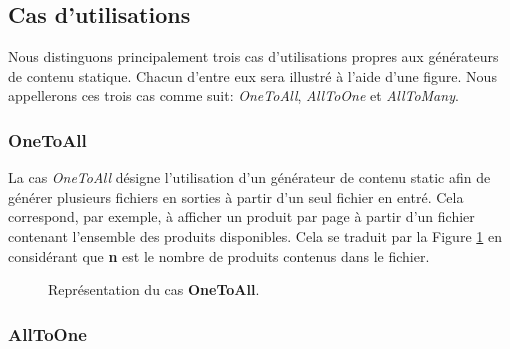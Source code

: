 	\subsection{Cas d'utilisations}
	
		Nous distinguons principalement trois cas d'utilisations propres aux générateurs de contenu statique. Chacun d'entre eux sera illustré à l'aide d'une figure. Nous appellerons ces trois cas comme suit: \textit{OneToAll}, \textit{AllToOne} et \textit{AllToMany}.\\
		
		\subsubsection*{OneToAll}
		
			La cas \textit{OneToAll} désigne l'utilisation d'un générateur de contenu static afin de générer plusieurs fichiers en sorties à partir d'un seul fichier en entré. Cela correspond, par exemple, à afficher un produit par page à partir d'un fichier contenant l'ensemble des produits disponibles. Cela se traduit par la Figure \ref{fig:OneToAll} en considérant que \textbf{n} est le nombre de produits contenus dans le fichier.
			
			\begin{figure}
				\begin{center}
					\caption{Représentation du cas \textbf{OneToAll}.}
					\label{fig:OneToAll}
				\end{center}
			\end{figure}
		
		\subsubsection*{AllToOne}
		
